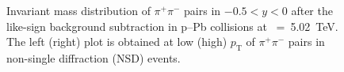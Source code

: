 \label{sec:ana}
\begin{figure}[hbt!]
	\centering
	\caption{ Invariant mass distribution of $\pi^{+}\pi^{-}$ pairs in $-0.5<y<0$ after the like-sign background subtraction in p--Pb collisions at \snn~=~5.02~TeV. The left (right) plot is obtained at low (high) $p_{\mathrm{T}}$ of $\pi^{+}\pi^{-}$ pairs in non-single diffraction (NSD) events. }
	\label{fig:SigExt}
\end{figure}

